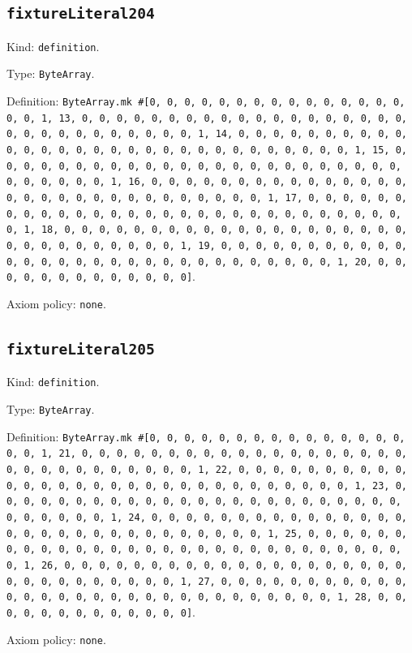 \documentclass[11pt]{article}
\begin{document}
\subsection*{\texttt{fixtureLiteral204}}
\noindent Kind: \texttt{definition}.\par
\noindent Type: \texttt{ByteArray}.\par
\noindent Definition: \texttt{ByteArray.mk \#[0, 0, 0, 0, 0, 0, 0, 0, 0, 0, 0, 0, 0, 0, 0, 0, 0, 1, 13, 0, 0, 0, 0, 0, 0, 0, 0, 0, 0, 0, 0, 0, 0, 0, 0, 0, 0, 0, 0, 0, 0, 0, 0, 0, 0, 0, 0, 0, 0, 1, 14, 0, 0, 0, 0, 0, 0, 0, 0, 0, 0, 0, 0, 0, 0, 0, 0, 0, 0, 0, 0, 0, 0, 0, 0, 0, 0, 0, 0, 0, 0, 1, 15, 0, 0, 0, 0, 0, 0, 0, 0, 0, 0, 0, 0, 0, 0, 0, 0, 0, 0, 0, 0, 0, 0, 0, 0, 0, 0, 0, 0, 0, 0, 1, 16, 0, 0, 0, 0, 0, 0, 0, 0, 0, 0, 0, 0, 0, 0, 0, 0, 0, 0, 0, 0, 0, 0, 0, 0, 0, 0, 0, 0, 0, 0, 1, 17, 0, 0, 0, 0, 0, 0, 0, 0, 0, 0, 0, 0, 0, 0, 0, 0, 0, 0, 0, 0, 0, 0, 0, 0, 0, 0, 0, 0, 0, 0, 1, 18, 0, 0, 0, 0, 0, 0, 0, 0, 0, 0, 0, 0, 0, 0, 0, 0, 0, 0, 0, 0, 0, 0, 0, 0, 0, 0, 0, 0, 0, 0, 1, 19, 0, 0, 0, 0, 0, 0, 0, 0, 0, 0, 0, 0, 0, 0, 0, 0, 0, 0, 0, 0, 0, 0, 0, 0, 0, 0, 0, 0, 0, 0, 1, 20, 0, 0, 0, 0, 0, 0, 0, 0, 0, 0, 0, 0, 0]}.\par
\noindent Axiom policy: \texttt{none}.\par
\subsection*{\texttt{fixtureLiteral205}}
\noindent Kind: \texttt{definition}.\par
\noindent Type: \texttt{ByteArray}.\par
\noindent Definition: \texttt{ByteArray.mk \#[0, 0, 0, 0, 0, 0, 0, 0, 0, 0, 0, 0, 0, 0, 0, 0, 0, 1, 21, 0, 0, 0, 0, 0, 0, 0, 0, 0, 0, 0, 0, 0, 0, 0, 0, 0, 0, 0, 0, 0, 0, 0, 0, 0, 0, 0, 0, 0, 0, 1, 22, 0, 0, 0, 0, 0, 0, 0, 0, 0, 0, 0, 0, 0, 0, 0, 0, 0, 0, 0, 0, 0, 0, 0, 0, 0, 0, 0, 0, 0, 0, 1, 23, 0, 0, 0, 0, 0, 0, 0, 0, 0, 0, 0, 0, 0, 0, 0, 0, 0, 0, 0, 0, 0, 0, 0, 0, 0, 0, 0, 0, 0, 0, 1, 24, 0, 0, 0, 0, 0, 0, 0, 0, 0, 0, 0, 0, 0, 0, 0, 0, 0, 0, 0, 0, 0, 0, 0, 0, 0, 0, 0, 0, 0, 0, 1, 25, 0, 0, 0, 0, 0, 0, 0, 0, 0, 0, 0, 0, 0, 0, 0, 0, 0, 0, 0, 0, 0, 0, 0, 0, 0, 0, 0, 0, 0, 0, 1, 26, 0, 0, 0, 0, 0, 0, 0, 0, 0, 0, 0, 0, 0, 0, 0, 0, 0, 0, 0, 0, 0, 0, 0, 0, 0, 0, 0, 0, 0, 0, 1, 27, 0, 0, 0, 0, 0, 0, 0, 0, 0, 0, 0, 0, 0, 0, 0, 0, 0, 0, 0, 0, 0, 0, 0, 0, 0, 0, 0, 0, 0, 0, 1, 28, 0, 0, 0, 0, 0, 0, 0, 0, 0, 0, 0, 0, 0]}.\par
\noindent Axiom policy: \texttt{none}.\par
\end{document}
